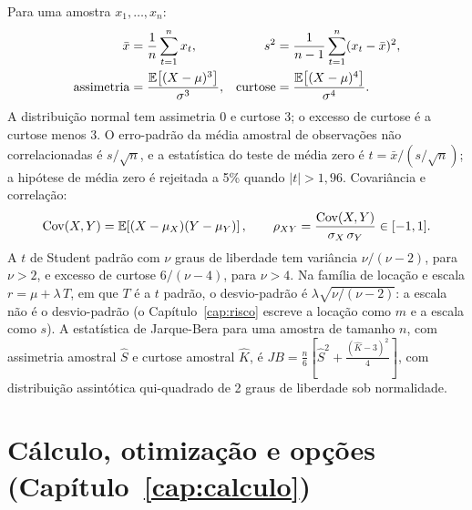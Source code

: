 Para uma amostra $x_1, \dots, x_n$:
\begin{align*}
\bar{x} &= \frac{1}{n}\sum_{t=1}^{n} x_t , &
s^2 &= \frac{1}{n-1}\sum_{t=1}^{n}(x_t - \bar{x})^2 , \\
\text{assimetria} &= \frac{\operatorname{\mathbb{E}}\!\left[(X-\mu)^3\right]}{\sigma^3} , &
\text{curtose} &= \frac{\operatorname{\mathbb{E}}\!\left[(X-\mu)^4\right]}{\sigma^4} .
\end{align*}
A distribuição normal tem assimetria 0 e curtose 3; o excesso de curtose é a curtose menos 3. O erro-padrão da média amostral de observações não correlacionadas é $s/\sqrt{n}$, e a estatística do teste de média zero é $t = \bar{x}/(s/\sqrt{n})$; a hipótese de média zero é rejeitada a 5\% quando $|t| > 1,96$. Covariância e correlação:
\begin{equation*}
\operatorname{Cov}(X, Y) = \operatorname{\mathbb{E}}\!\left[(X-\mu_X)(Y-\mu_Y)\right] , \qquad \rho_{XY} = \frac{\operatorname{Cov}(X, Y)}{\sigma_X\,\sigma_Y} \in [-1, 1] .
\end{equation*}
A $t$ de Student padrão com $\nu$ graus de liberdade tem variância $\nu/(\nu-2)$, para $\nu > 2$, e excesso de curtose $6/(\nu-4)$, para $\nu > 4$. Na família de locação e escala $r = \mu + \lambda\,T$, em que $T$ é a $t$ padrão, o desvio-padrão é $\lambda\sqrt{\nu/(\nu-2)}$: a escala não é o desvio-padrão (o Capítulo~\ref{cap:risco} escreve a locação como $m$ e a escala como $s$). A estatística de Jarque-Bera para uma amostra de tamanho $n$, com assimetria amostral $\hat S$ e curtose amostral $\hat K$, é $\mathit{JB} = \frac{n}{6}\left[\hat S^2 + \frac{(\hat K-3)^2}{4}\right]$, com distribuição assintótica qui-quadrado de 2 graus de liberdade sob normalidade.

\section{Cálculo, otimização e opções (Capítulo~\ref{cap:calculo})}

